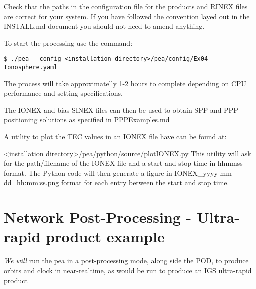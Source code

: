 Check that the paths in the configuration file for the products and RINEX files are correct for your system. 
If you have followed the convention layed out in the INSTALL.md document you should not need to amend anything.

To start the processing use the command:
\begin{lstlisting}
$ ./pea --config <installation directory>/pea/config/Ex04-Ionosphere.yaml
\end{lstlisting}

The process will take approximatelly 1-2 hours to complete depending on CPU performance and setting specifications.

The IONEX and bias-SINEX files can then be used to obtain SPP and PPP positioning solutions as specified in PPPExamples.md

A utility to plot the TEC values in an IONEX file have can be found at:

<installation directory>/pea/python/source/plotIONEX.py
This utility will ask for the path/filename of the IONEX file and a start and stop time in hhmmss format. The Python code will then generate a figure in IONEX\_yyyy-mm-dd\_hh:mm:ss.png format for each entry between the start and stop time.

\section{Network Post-Processing - Ultra-rapid product example}

\textit{We will} run the pea in a post-processing mode, along side the POD, to produce orbits and clock in near-realtime, as would be run to produce an IGS ultra-rapid product





